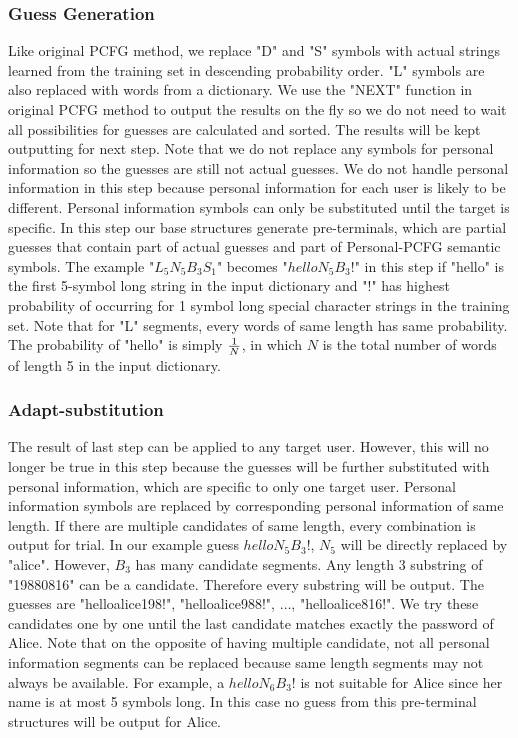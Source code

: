 \subsubsection{Guess Generation}
Like original PCFG method, we replace "D" and "S" symbols with actual strings learned from the training set in descending probability order. "L" symbols are also replaced with words from a dictionary. We use the "NEXT" function \cite{weir2009password} in original PCFG method to output the results on the fly so we do not need to wait all possibilities for guesses are calculated and sorted. The results will be kept outputting for next step. Note that we do not replace any symbols for personal information so the guesses are still not actual guesses. We do not handle personal information in this step because personal information for each user is likely to be different. Personal information symbols can only be substituted until the target is specific. In this step our base structures generate pre-terminals, which are partial guesses that contain part of actual guesses and part of Personal-PCFG semantic symbols. The example "$L_5N_5B_3S_1$" becomes "$helloN_5B_3!$" in this step if "hello" is the first 5-symbol long string in the input dictionary and "!" has highest probability of occurring for 1 symbol long special character strings in the training set. Note that for "L" segments, every words of same length has same probability. The probability of "hello" is simply $1\over N$, in which $N$ is the total number of words of length 5 in the input dictionary. 

\subsubsection{Adapt-substitution}
The result of last step can be applied to any target user. However, this will no longer be true in this step because the guesses will be further substituted with personal information, which are specific to only one target user. Personal information symbols are replaced by corresponding personal information of same length. If there are multiple candidates of same length, every combination is output for trial. In our example guess $helloN_5B_3!$, $N_5$ will be directly replaced by "alice". However, $B_3$ has many candidate segments. Any length 3 substring of "19880816" can be a candidate. Therefore every substring will be output. The guesses are "helloalice198!", "helloalice988!", $\ldots$, "helloalice816!". We try these candidates one by one until the last candidate matches exactly the password of Alice. Note that on the opposite of having multiple candidate, not all personal information segments can be replaced because same length segments may not always be available. For example, a $helloN_6B_3!$ is not suitable for Alice since her name is at most 5 symbols long. In this case no guess from this pre-terminal structures will be output for Alice. 

